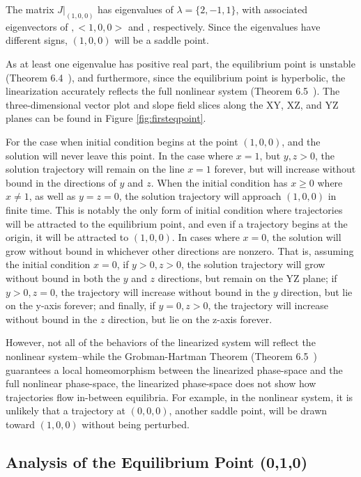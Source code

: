 \documentclass[10pt]{article}
\begin{document}
The matrix \(J|_{(1,0,0)}\) has eigenvalues of \(\lambda = \{2,-1,1\}\), with associated eigenvectors of \(<-1,3,0>,<1,0,0>\) and \(<0,0,1>\), respectively. Since the eigenvalues have different signs, \( (1,0,0) \) will be a saddle point.

As at least one eigenvalue has positive real part, the equilibrium point is unstable (Theorem 6.4~\cite{PLT}), and furthermore, since the equilibrium point is hyperbolic, the linearization accurately reflects the full nonlinear system (Theorem 6.5~\cite{PLT}). The three-dimensional vector plot and slope field slices along the XY, XZ, and YZ planes can be found in Figure \ref{fig:firsteqpoint}.

For the case when initial condition begins at the point \((1,0,0)\), and the solution will never leave this point. In the case where \(x=1\), but \(y,z>0\), the solution trajectory will remain on the line \(x=1\) forever, but will increase without bound in the directions of $y$ and $z$. When the initial condition has  \(x \geq 0\) where \(x\neq 1\), as well as \(y=z=0\), the solution trajectory will approach \((1,0,0)\) in finite time. This is notably the only form of initial condition where trajectories will be attracted to the equilibrium point, and even if a trajectory begins at the origin, it will be attracted to \((1,0,0)\). In cases where \(x=0\), the solution will grow without bound in whichever other directions are nonzero. That is, assuming the initial condition \(x=0\), if \(y>0,z>0\), the solution trajectory will grow without bound in both the $y$ and $z$ directions, but remain on the YZ plane; if \(y>0,z=0\), the trajectory will increase without bound in the $y$ direction, but lie on the y-axis forever; and finally, if \(y=0,z>0\), the trajectory will increase without bound in the $z$ direction, but lie on the z-axis forever.

However, not all of the behaviors of the linearized system will reflect the nonlinear system--while the Grobman-Hartman Theorem (Theorem 6.5~\cite{PLT}) guarantees a local homeomorphism between the linearized phase-space and the full nonlinear phase-space, the linearized phase-space does not show how trajectories flow in-between equilibria. For example, in the nonlinear system, it is unlikely that a trajectory at \((0,0,0)\), another saddle point, will be drawn toward \((1,0,0)\) without being perturbed. 

\subsection{Analysis of the Equilibrium Point (0,1,0)}
\end{document}

